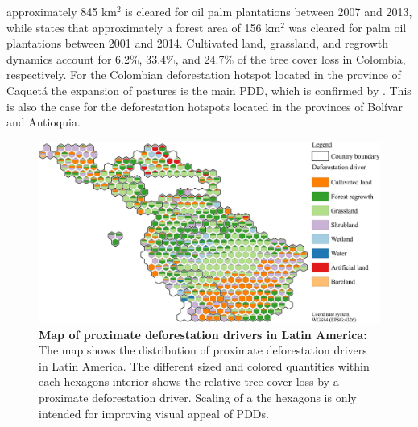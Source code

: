 approximately 845 km$^2$ is cleared for oil palm plantations between 2007 and 2013, while \citet{Furumo2017} states that approximately a forest area of 156 km$^2$ was cleared for palm oil plantations between 2001 and 2014. Cultivated land, grassland, and regrowth dynamics account for 6.2\%, 33.4\%, and 24.7\% of the tree cover loss in Colombia, respectively. For the Colombian deforestation hotspot located in the province of Caquetá the expansion of pastures is the main \ac{PDD}, which is confirmed by \citet{Graesser2015}. This is also the case for the deforestation hotspots located in the provinces of Bolívar and Antioquia.
			\begin{figure}[ht]
				\centering
				\includegraphics[scale=1]{img/americas_driver_frameless}
				\caption[Map of proximate deforestation drivers in Latin America]{\textbf{Map of proximate deforestation drivers in Latin America:} The map shows the distribution of proximate deforestation drivers in Latin America. The different sized and colored quantities within each hexagons interior shows the relative tree cover loss by a proximate deforestation driver. Scaling of a the hexagons is only intended for improving visual appeal of \acp{PDD}.}
				\label{fig:americas_driver}
			\end{figure}

